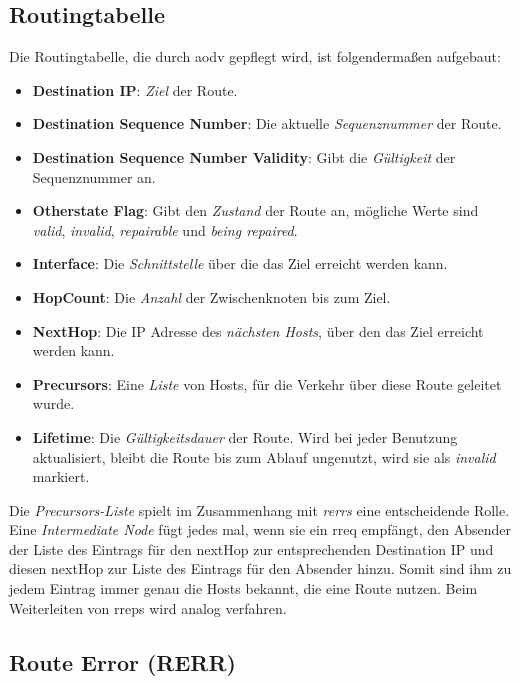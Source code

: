 \subsection{Routingtabelle}
\label{chapter:routing:aodv:funktion:rt}

Die Routingtabelle, die durch \gls{aodv} gepflegt wird, ist folgendermaßen aufgebaut:

\begin{itemize}
\item \textbf{Destination IP}: \textit{Ziel} der Route.
\item \textbf{Destination Sequence Number}: Die aktuelle \textit{Sequenznummer} der Route.
\item \textbf{Destination Sequence Number Validity}: Gibt die \textit{Gültigkeit} der Sequenznummer an.
\item \textbf{Otherstate Flag}: Gibt den \textit{Zustand} der Route an, mögliche Werte sind \textit{valid}, \textit{invalid}, \textit{repairable} und \textit{being repaired}.
\item \textbf{Interface}: Die \textit{Schnittstelle} über die das Ziel erreicht werden kann.
\item \textbf{HopCount}: Die \textit{Anzahl} der Zwischenknoten bis zum Ziel.
\item \textbf{NextHop}: Die IP Adresse des \textit{nächsten Hosts}, über den das Ziel erreicht werden kann.
\item \textbf{Precursors}: Eine \textit{Liste} von Hosts, für die Verkehr über diese Route geleitet wurde.
\item \textbf{Lifetime}: Die \textit{Gültigkeitsdauer} der Route. Wird bei jeder Benutzung aktualisiert, bleibt die Route bis zum Ablauf ungenutzt, wird sie als \textit{invalid} markiert.
\end{itemize}

Die \textit{Precursors-Liste} spielt im Zusammenhang mit \textit{\glspl{rerr}} eine entscheidende Rolle. Eine \textit{Intermediate Node} fügt jedes mal, wenn sie ein \gls{rreq} empfängt, den Absender der Liste des Eintrags für den nextHop zur entsprechenden Destination IP und diesen nextHop zur Liste des Eintrags für den Absender hinzu. Somit sind ihm zu jedem Eintrag immer genau die Hosts bekannt, die eine Route nutzen. Beim Weiterleiten von \glspl{rrep} wird analog verfahren.

\subsection{Route Error (RERR)}
\label{chapter:routing:aodv:funktion:rerr}


